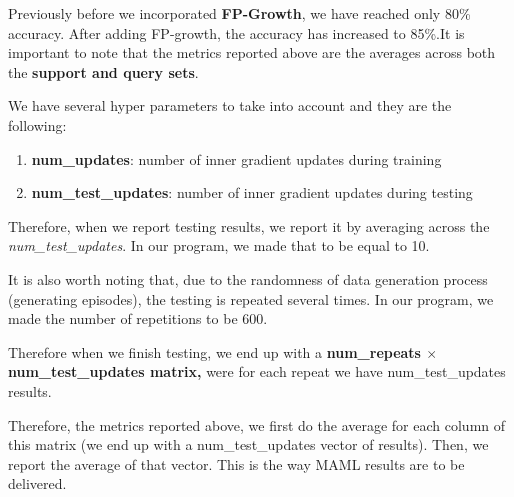 \documentclass{article}
\begin{document}
Previously before we incorporated \textbf{FP-Growth}, we have reached only 80\% accuracy. After adding FP-growth, the accuracy has increased to 85\%.It is important to note that the metrics reported above are the averages across both the \textbf{support and query sets}.

We have several hyper parameters to take into account and they are the following:
\begin{enumerate}
    \item \textbf{num\_updates}: number of inner gradient updates during training
    \item \textbf{num\_test\_updates}: number of inner gradient updates during testing
\end{enumerate}
Therefore, when we report testing results, we report it by averaging across the \textit{num\_test\_updates}. In our program, we made that to be equal to 10.

\noindent It is also worth noting that, due to the randomness of data generation process (generating episodes), the testing is repeated several times. In our program, we made the number of repetitions to be 600.

\noindent Therefore when we finish testing, we end up with a \textbf{num\_repeats $\times$ num\_test\_updates matrix,} were for each repeat we have num\_test\_updates results.

\noindent Therefore, the metrics reported above, we first do the average for each column of this matrix (we end up with a  num\_test\_updates vector of results). Then, we report the average of that vector. This is the way MAML results are to be delivered.
\end{document}
